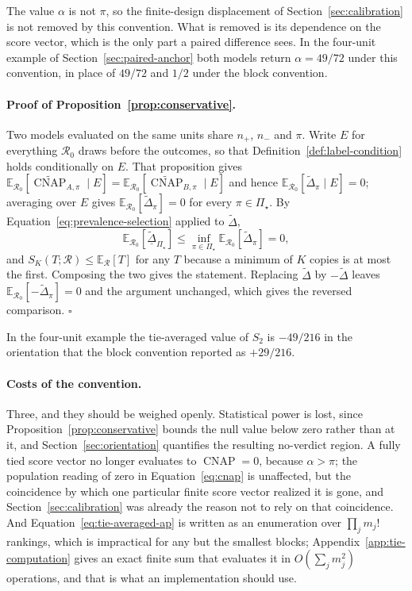 \documentclass[11pt]{article}
\newcommand{\CNAP}{\operatorname{CNAP}}
\newcommand{\Regime}{\mathcal{R}}
\newcommand{\PSet}{\Pi_\star}
\newcommand{\E}{\mathbb{E}}
\newcommand{\CNAPta}{\widetilde{\CNAP}}
\newcommand{\Dta}{\widetilde{\Delta}}
\newcommand{\RobDta}{\underline{\widetilde{\Delta}}_{\PSet}}
\theoremstyle{remark}
\begin{document}
The value $\alpha$ is not $\pi$, so the finite-design displacement of Section~\ref{sec:calibration} is not removed by this convention. What is removed is its dependence on the score vector, which is the only part a paired difference sees. In the four-unit example of Section~\ref{sec:paired-anchor} both models return $\alpha=49/72$ under this convention, in place of $49/72$ and $1/2$ under the block convention.

\paragraph{Proof of Proposition~\ref{prop:conservative}.}
Two models evaluated on the same units share $n_+$, $n_-$ and $\pi$. Write $E$ for everything $\Regime_0$ draws before the outcomes, so that Definition~\ref{def:label-condition} holds conditionally on $E$. That proposition gives $\E_{\Regime_0}[\CNAPta_{A,\pi}\mid E]=\E_{\Regime_0}[\CNAPta_{B,\pi}\mid E]$ and hence $\E_{\Regime_0}[\Dta_\pi\mid E]=0$; averaging over $E$ gives $\E_{\Regime_0}[\Dta_\pi]=0$ for every $\pi\in\PSet$. By Equation~\eqref{eq:prevalence-selection} applied to $\Dta$,
\[
\E_{\Regime_0}[\RobDta]
\leq
\inf_{\pi\in\PSet}\E_{\Regime_0}[\Dta_\pi]
=0 ,
\]
and $S_K(T;\Regime)\leq\E_{\Regime}[T]$ for any $T$ because a minimum of $K$ copies is at most the first. Composing the two gives the statement. Replacing $\Dta$ by $-\Dta$ leaves $\E_{\Regime_0}[-\Dta_\pi]=0$ and the argument unchanged, which gives the reversed comparison. $\square$

In the four-unit example the tie-averaged value of $S_2$ is $-49/216$ in the orientation that the block convention reported as $+29/216$.

\paragraph{Costs of the convention.}
Three, and they should be weighed openly. Statistical power is lost, since Proposition~\ref{prop:conservative} bounds the null value below zero rather than at it, and Section~\ref{sec:orientation} quantifies the resulting no-verdict region. A fully tied score vector no longer evaluates to $\CNAP=0$, because $\alpha>\pi$; the population reading of zero in Equation~\eqref{eq:cnap} is unaffected, but the coincidence by which one particular finite score vector realized it is gone, and Section~\ref{sec:calibration} was already the reason not to rely on that coincidence. And Equation~\eqref{eq:tie-averaged-ap} is written as an enumeration over $\prod_j m_j!$ rankings, which is impractical for any but the smallest blocks; Appendix~\ref{app:tie-computation} gives an exact finite sum that evaluates it in $O(\sum_j m_j^2)$ operations, and that is what an implementation should use.
\end{document}
